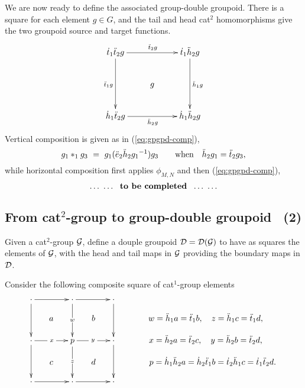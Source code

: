 \bigskip
We are now ready to define the associated group-double groupoid.
There is a square for each element  $g \in G$, 
and the tail and head cat$^2$ homomorphisms give the two groupoid 
source and target functions.
$$
\xymatrix{
\dtto\ddttt g \ar[rr]^{\ddttt g} \ar[dd]_{\ddtto g} 
  &   & \dtto\ddhht g \ar[dd]^{\ddhho g} \\
  & g & \\
\dhho\ddttt g \ar[rr]_{\ddhht g} 
  &   & \dhho\ddhht g \\
}
$$
Vertical composition is given as in (\ref{eq:gpgpd-comp}),
$$
g_1 *_1 g_3 ~=~ g_1(\ddot{e}_2\ddot{h}_2{g_1}^{-1})g_3 
\qquad\mbox{when}\quad
\ddot{h}_2 g_1 = \ddot{t}_2 g_3,
$$
while horizontal composition first applies $\phi_{M,N}$ 
and then (\ref{eq:gpgpd-comp}),
$$
\ldots~\ldots ~~\mbox{{\bf to be completed}} ~~\ldots~\ldots
$$



\newpage
\subsection{From cat$^2$-group to group-double groupoid ~(2)}

Given a cat$^2$-group $\mathcal{G}$,  define a douple groupoid 
$\mathcal{D} = \mathcal{D}(\mathcal{G})$ to have as squares the elements of $\mathcal{G}$, 
with the head and tail maps in $\mathcal{G}$ providing the 
boundary maps in $\mathcal{D}$.

Consider the following composite square of cat$^1$-group elements
$$
\xymatrix  @C=1.2pc @R=0.8pc{
\cdot \ar[rr] \ar[dd]
  &   & \cdot \ar[rr] \ar[dd]|{\phantom{gZ}w\phantom{gZ}}
          &   & \cdot \ar[dd] 
                 &   &  \\
  & a &   & b &  &   &  w = \ddhho a = \ddtto b,\quad
                        z = \ddhho c = \ddtto d, \hspace{6mm}\\
\cdot \ar[rr]|{~x~} \ar[dd] 
  &   & p \ar[rr]|{~y~} \ar[dd]|{\phantom{gZ}z\phantom{gZ}}
          &   & \cdot \ar[dd] 
                 &   &  x = \ddhht a = \ddttt c,\quad
                        y = \ddhht b = \ddttt d, \hspace{6mm}
\\
  & c &   & d &  &   &  p = \dhho\ddhht a = \dhht\ddtto b 
                          = \dttt\ddhho c = \dtto\ddttt d. \\
\cdot \ar[rr] 
  &   & \cdot \ar[rr] 
          &   & \cdot 
                 &   &  \\
}
$$


